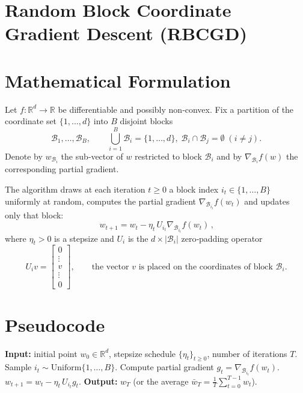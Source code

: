 \documentclass{article}
\begin{document}
\section*{Random Block Coordinate Gradient Descent (RBCGD)}

\section*{Mathematical Formulation}
Let $f:\mathbb{R}^{d}\rightarrow\mathbb{R}$ be differentiable and possibly non‑convex.  
Fix a partition of the coordinate set $\{1,\dots ,d\}$ into $B$ disjoint blocks
\[
\mathcal{B}_{1},\dots ,\mathcal{B}_{B},\qquad 
\bigcup_{i=1}^{B}\mathcal{B}_{i}=\{1,\dots ,d\},\; \mathcal{B}_{i}\cap\mathcal{B}_{j}=\emptyset\;(i\neq j).
\]
Denote by $w_{\mathcal{B}_{i}}$ the sub‑vector of $w$ restricted to block $\mathcal{B}_{i}$ and by
$\nabla_{\mathcal{B}_{i}}f(w)$ the corresponding partial gradient.

The algorithm draws at each iteration $t\ge 0$ a block index $i_{t}\in\{1,\dots ,B\}$ uniformly at random,
computes the partial gradient $\nabla_{\mathcal{B}_{i_{t}}}f(w_{t})$ and updates only that block:
\[
\boxed{\,w_{t+1}= w_{t} - \eta_{t}\,U_{i_{t}}\nabla_{\mathcal{B}_{i_{t}}}f(w_{t})\,},
\tag{1}
\]
where $\eta_{t}>0$ is a stepsize and $U_{i}$ is the $d\times |\mathcal{B}_{i}|$ zero‑padding operator
\[
U_{i}v=
\begin{bmatrix}
0\\ \vdots \\ v \\ \vdots \\ 0
\end{bmatrix},
\qquad
\text{the vector $v$ is placed on the coordinates of block }\mathcal{B}_{i}.
\]

\section*{Pseudocode}
\begin{algorithm}[H]
\caption{Random Block Coordinate Gradient Descent}
\begin{algorithmic}[1]
\State \textbf{Input:} initial point $w_{0}\in\mathbb{R}^{d}$, stepsize schedule $\{\eta_{t}\}_{t\ge0}$, number of iterations $T$.
    \State Sample $i_{t}\sim\text{Uniform}\{1,\dots ,B\}$.
    \State Compute partial gradient $g_{t}= \nabla_{\mathcal{B}_{i_{t}}}f(w_{t})$.
    \State $w_{t+1}= w_{t} - \eta_{t}\,U_{i_{t}} g_{t}$.
\EndFor
\State \textbf{Output:} $w_{T}$ (or the average $\bar w_{T}= \frac1T\sum_{t=0}^{T-1} w_{t}$).
\end{algorithmic}
\end{algorithm}
\end{document}
